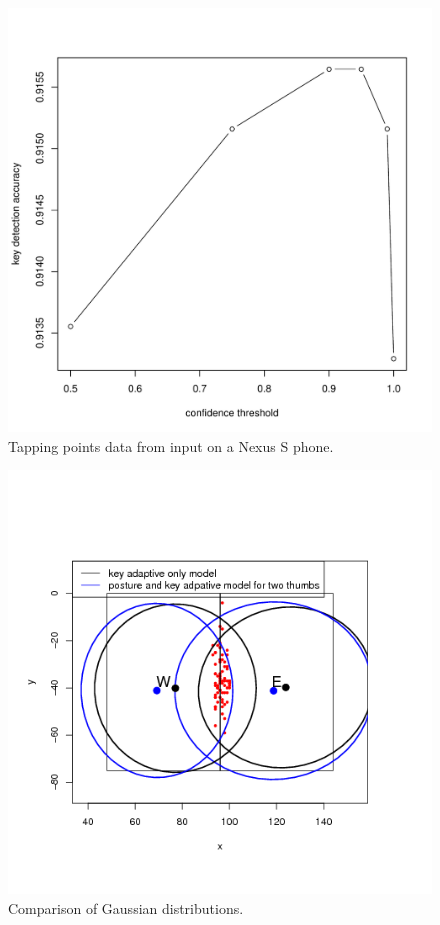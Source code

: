 \documentclass{sigchi}
\begin{document}
\begin{figure}[tb]
 \includegraphics[width=1\columnwidth]{figures/posture-confidence.pdf}
  \caption{Tapping points data from input on a Nexus S phone.}
  \label{fig:time-distance}
\end{figure}

\begin{figure}[tb]
 \includegraphics[width=1\columnwidth]{figures/key-posture-ellipse.png}
  \caption{Comparison of Gaussian distributions.}
  \label{fig:time-distance}
\end{figure}
\end{document}
